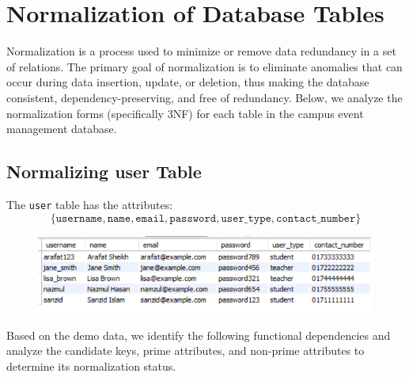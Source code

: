 \section{Normalization of Database Tables}

Normalization is a process used to minimize or remove data redundancy in a set of relations. The primary goal of normalization is to eliminate anomalies that can occur during data insertion, update, or deletion, thus making the database consistent, dependency-preserving, and free of redundancy. Below, we analyze the normalization forms (specifically 3NF) for each table in the campus event management database.

\subsection{Normalizing user Table}

The \texttt{user} table has the attributes:
\[
\{ \texttt{username}, \texttt{name}, \texttt{email}, \texttt{password}, \texttt{user\_type}, \texttt{contact\_number} \}
\]
\begin{figure}[h]
    \centering
    \includegraphics[scale=0.7]{images/table_data/user_table.png}
\end{figure}



Based on the demo data, we identify the following functional dependencies and analyze the candidate keys, 
prime attributes, and non-prime attributes to determine its normalization status.


